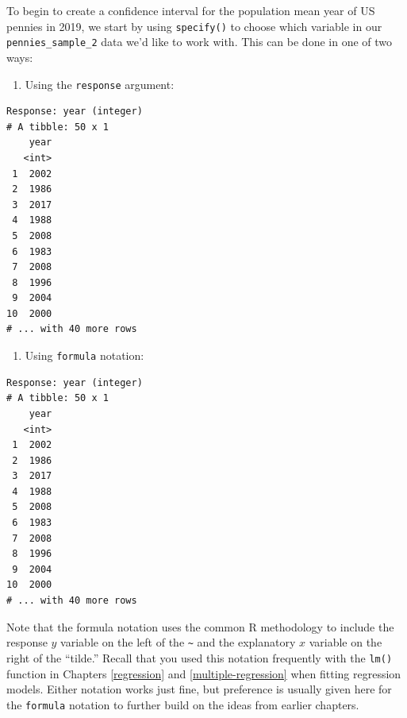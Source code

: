 \documentclass[12pt, krantz2,]{krantz}
\makeatletter
\newenvironment{Shaded}{\begin{snugshade}}{\end{snugshade}}
\newcommand{\DataTypeTok}[1]{\textcolor[rgb]{0.27,0.27,0.27}{#1}}
\newcommand{\DecValTok}[1]{\textcolor[rgb]{0.06,0.06,0.06}{#1}}
\newcommand{\KeywordTok}[1]{\textcolor[rgb]{0.27,0.27,0.27}{\textbf{#1}}}
\newcommand{\NormalTok}[1]{#1}
\newcommand{\OperatorTok}[1]{\textcolor[rgb]{0.43,0.43,0.43}{\textbf{#1}}}
\newcommand{\OtherTok}[1]{\textcolor[rgb]{0.37,0.37,0.37}{#1}}
\newcommand{\StringTok}[1]{\textcolor[rgb]{0.5,0.5,0.5}{#1}}
\providecommand{\tightlist}{%
  \setlength{\itemsep}{0pt}\setlength{\parskip}{0pt}}
\newenvironment{kframe}{%
\medskip{}
\setlength{\fboxsep}{.8em}
 \def\at@end@of@kframe{}%
 \ifinner\ifhmode%
  \def\at@end@of@kframe{\end{minipage}}%
  \begin{minipage}{\columnwidth}%
 \fi\fi%
 \def\FrameCommand##1{\hskip\@totalleftmargin \hskip-\fboxsep
 \colorbox{shadecolor}{##1}\hskip-\fboxsep
     \hskip-\linewidth \hskip-\@totalleftmargin \hskip\columnwidth}%
 \MakeFramed {\advance\hsize-\width
   \@totalleftmargin\z@ \linewidth\hsize
   \@setminipage}}%
 {\par\unskip\endMakeFramed%
 \at@end@of@kframe}
\renewenvironment{Shaded}{\begin{kframe}}{\end{kframe}}
\makeatother
\begin{document}
To begin to create a confidence interval for the population mean year of US pennies in 2019, we start by using \texttt{specify()} to choose which variable in our \texttt{pennies\_sample\_2} data we'd like to work with. This can be done in one of two ways:

\begin{enumerate}
\def\labelenumi{\arabic{enumi}.}
\tightlist
\item
  Using the \texttt{response} argument:
\end{enumerate}

\begin{Shaded}
\end{Shaded}

\begin{verbatim}
Response: year (integer)
# A tibble: 50 x 1
    year
   <int>
 1  2002
 2  1986
 3  2017
 4  1988
 5  2008
 6  1983
 7  2008
 8  1996
 9  2004
10  2000
# ... with 40 more rows
\end{verbatim}

\begin{enumerate}
\def\labelenumi{\arabic{enumi}.}
\setcounter{enumi}{1}
\tightlist
\item
  Using \texttt{formula} notation:
\end{enumerate}

\begin{Shaded}
\end{Shaded}

\begin{verbatim}
Response: year (integer)
# A tibble: 50 x 1
    year
   <int>
 1  2002
 2  1986
 3  2017
 4  1988
 5  2008
 6  1983
 7  2008
 8  1996
 9  2004
10  2000
# ... with 40 more rows
\end{verbatim}

Note that the formula notation uses the common R methodology to include the response \(y\) variable on the left of the \texttt{\textasciitilde{}} and the explanatory \(x\) variable on the right of the ``tilde.'' Recall that you used this notation frequently with the \texttt{lm()} function in Chapters \ref{regression} and \ref{multiple-regression} when fitting regression models. Either notation works just fine, but preference is usually given here for the \texttt{formula} notation to further build on the ideas from earlier chapters.
\end{document}
